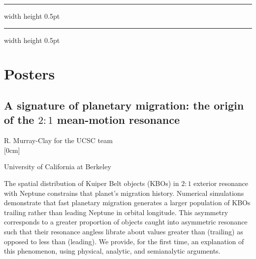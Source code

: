 \documentclass[a4paper,11pt]{book}
\def\doubleline{
\hrule width \hsize height 0.5pt  \kern 1mm \hrule width \hsize height 0.5pt 
}
\begin{document}
\noindent\doubleline
        



\chapter*{Posters}
        
          \section[A signature of planetary migration: the origin of the $2:1$ mean-motion resonance \newline(R. Murray-Clay)] { A signature of planetary migration: the origin of the $2:1$ mean-motion resonance }



\begin{center}
{\large R. Murray-Clay for the UCSC team}\\



[0cm]



  
\vspace{2 mm}
\noindent University of California at Berkeley\\

\end{center}



  
\vspace{2 mm}
\noindent The spatial distribution of Kuiper Belt objects (KBOs) in $2:1$ exterior resonance with Neptune constrains that planet’s migration history. Numerical simulations demonstrate that fast planetary migration generates a larger population of KBOs trailing rather than leading Neptune in orbital longitude. This asymmetry corresponds to a greater proportion of objects caught into asymmetric resonance such that their resonance angless librate about values greater than (trailing) as opposed to less than (leading). We provide, for the first time, an explanation of this phenomenon, using physical, analytic, and semianalytic arguments.
\end{document}
